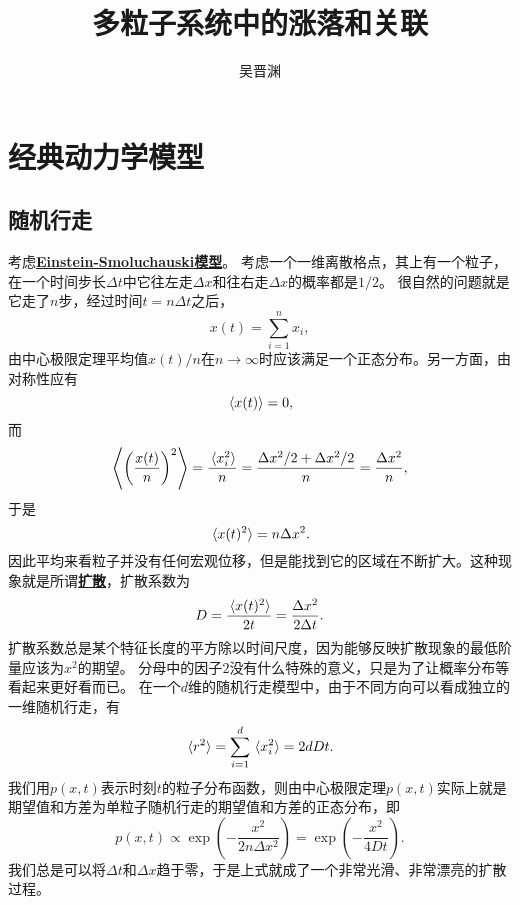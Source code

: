 \documentclass[hyperref, UTF8, a4paper]{ctexart}
\title{多粒子系统中的涨落和关联}
\author{吴晋渊}
\newcommand{\concept}[1]{\underline{\textbf{#1}}}
\begin{document}
\maketitle

\section{经典动力学模型}

\subsection{随机行走}

考虑\concept{Einstein-Smoluchauski模型}。 %
考虑一个一维离散格点，其上有一个粒子，在一个时间步长$\Delta t$中它往左走$\Delta x$和往右走$\Delta x$的概率都是$1/2$。
很自然的问题就是它走了$n$步，经过时间$t=n \Delta t$之后，
\[
    x(t) = \sum_{i=1}^n x_i,
\]
由中心极限定理平均值$x(t)/n$在$n \to \infty$时应该满足一个正态分布。另一方面，由对称性应有
\begin{equation}
    \expval*{x(t)} = 0,
\end{equation}
而
\[
    \expval{\left( \frac{x(t)}{n} \right)^2} = \frac{\expval*{x_i^2}}{n} = \frac{\Delta x^2 / 2 + \Delta x^2 / 2}{n} = \frac{\Delta x^2}{n},
\]
于是
\begin{equation}
    \expval*{x(t)^2} = n \Delta x^2.
\end{equation}
因此平均来看粒子并没有任何宏观位移，但是能找到它的区域在不断扩大。这种现象就是所谓\concept{扩散}，扩散系数为
\begin{equation}
    D = \frac{\expval*{x(t)^2}}{2 t} = \frac{\Delta x^2}{2 \Delta t}.
\end{equation}
扩散系数总是某个特征长度的平方除以时间尺度，因为能够反映扩散现象的最低阶量应该为$x^2$的期望。
分母中的因子$2$没有什么特殊的意义，只是为了让概率分布等看起来更好看而已。
在一个$d$维的随机行走模型中，由于不同方向可以看成独立的一维随机行走，有
\begin{equation}
    \expval*{r^2} = \sum_{i=1}^d \expval*{x_i^2} = 2 d D t.
\end{equation}
我们用$p(x, t)$表示时刻$t$的粒子分布函数，则由中心极限定理$p(x, t)$实际上就是期望值和方差为单粒子随机行走的期望值和方差的正态分布，即
\begin{equation}
    p(x, t) \propto \exp(-\frac{x^2}{2 n \Delta x^2}) = \exp(- \frac{x^2}{4 D t}).
\end{equation}
我们总是可以将$\Delta t$和$\Delta x$趋于零，于是上式就成了一个非常光滑、非常漂亮的扩散过程。
\end{document}
